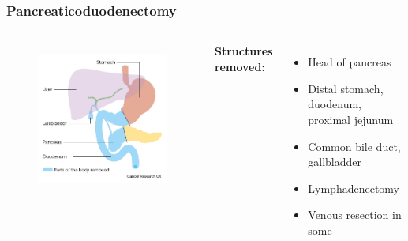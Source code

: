 \documentclass[10pt]{beamer}
\begin{document}
\begin{frame}
	\frametitle{Pancreaticoduodenectomy}
	\begin{columns}[t]
		\begin{figure}
			\centering
			\includegraphics[width=0.8\linewidth]{whipple_schematic_pre}
			\label{fig:whipple_schematic_pre}
		\end{figure}
		{\scriptsize
			\textbf{Structures removed:}
			\begin{itemize}
			\item Head of pancreas
			\item Distal stomach, duodenum, proximal jejunum
			\item  Common bile duct, gallbladder
			\item Lymphadenectomy
			\item Venous resection in some
		\end{itemize}}
	

\end{columns}
\end{frame}
\end{document}
